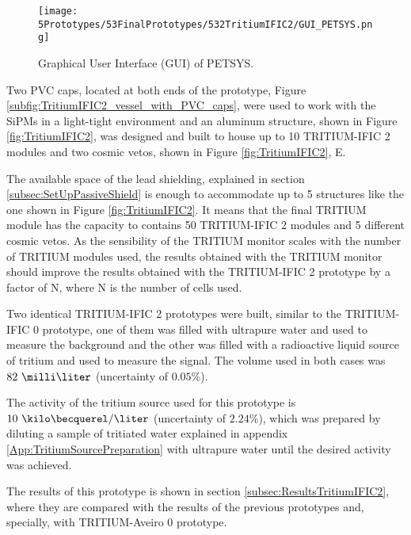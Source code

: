 \begin{figure}[h]
\centering
\texttt{[image: 5Prototypes/53FinalPrototypes/532TritiumIFIC2/GUI\_PETSYS.png]}
\caption{Graphical User Interface (GUI) of PETSYS.\label{fig:GUI_PETSYS}}
\end{figure}

Two PVC caps, located at both ends of the prototype, Figure \ref{subfig:TritiumIFIC2_vessel_with_PVC_caps}, were used to work with the SiPMs in a light-tight environment and an aluminum structure, shown in Figure \ref{fig:TritiumIFIC2}, was designed and built to house up to 10 TRITIUM-IFIC 2 modules and two cosmic vetos, shown in Figure \ref{fig:TritiumIFIC2}, E.

The available space of the lead shielding, explained in section \ref{subsec:SetUpPassiveShield} is enough to accommodate up to 5 structures like the one shown in Figure \ref{fig:TritiumIFIC2}. It means that the final TRITIUM module has the capacity to contains 50 TRITIUM-IFIC 2 modules and 5 different cosmic vetos. As the sensibility of the TRITIUM monitor scales with the number of TRITIUM modules used, the results obtained with the TRITIUM monitor should improve the results obtained with the TRITIUM-IFIC 2 prototype by a factor of N, where N is the number of cells used.

Two identical TRITIUM-IFIC 2 prototypes were built, similar to the TRITIUM-IFIC 0 prototype, one of them was filled with ultrapure water and used to measure the background and the other was filled with a radioactive liquid source of tritium and used to measure the signal. The volume used in both cases was $82~\milli\liter$ (uncertainty of $0.05\%$).

The activity of the tritium source used for this prototype is $10~\kilo\becquerel/\liter$ (uncertainty of $2.24\%$), which was prepared by diluting a sample of tritiated water explained in appendix \ref{App:TritiumSourcePreparation} with ultrapure water until the desired activity was achieved.

The results of this prototype is shown in section \ref{subsec:ResultsTritiumIFIC2}, where they are compared with the results of the previous prototypes and, specially, with TRITIUM-Aveiro 0 prototype.